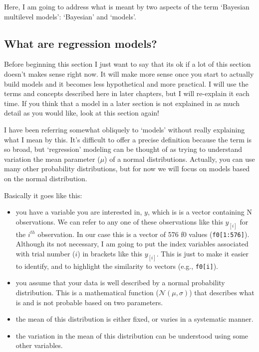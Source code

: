 \documentclass[
]{book}
\begin{document}
Here, I am going to address what is meant by two aspects of the term `Bayesian multilevel models': `Bayesian' and `models'.

\hypertarget{what-are-regression-models}{%
\subsection{What are regression models?}\label{what-are-regression-models}}

Before beginning this section I just want to say that its ok if a lot of this section doesn't makes sense right now. It will make more sense once you start to actually build models and it becomes less hypothetical and more practical. I will use the terms and concepts described here in later chapters, but I will re-explain it each time. If you think that a model in a later section is not explained in as much detail as you would like, look at this section again!

I have been referring somewhat obliquely to `models' without really explaining what I mean by this. It's difficult to offer a precise definition because the term is so broad, but `regression' modeling can be thought of as trying to understand variation the mean parameter (\(\mu\)) of a normal distributions. Actually, you can use many other probability distributions, but for now we will focus on models based on the normal distribution.

Basically it goes like this:

\begin{itemize}
\item
  you have a variable you are interested in, \(y\), which is is a vector containing N observations. We can refer to any one of these observations like this \(y_{[i]}\) for the \(i^{th}\) observation. In our case this is a vector of 576 f0 values (\texttt{f0{[}1:576{]}}). Although its not necessary, I am going to put the index variables associated with trial number (\(i\)) in brackets like this \(y_{[i]}\). This is just to make it easier to identify, and to highlight the similarity to vectors (e.g., \texttt{f0{[}i{]}}).
\item
  you assume that your data is well described by a normal probability distribution. This is a mathematical function (\(\mathcal{N}(\mu,\sigma)\)) that describes what is and is not probable based on two parameters.
\item
  the mean of this distribution is either fixed, or varies in a systematic manner.
\item
  the variation in the mean of this distribution can be understood using some other variables.
\end{itemize}
\end{document}

